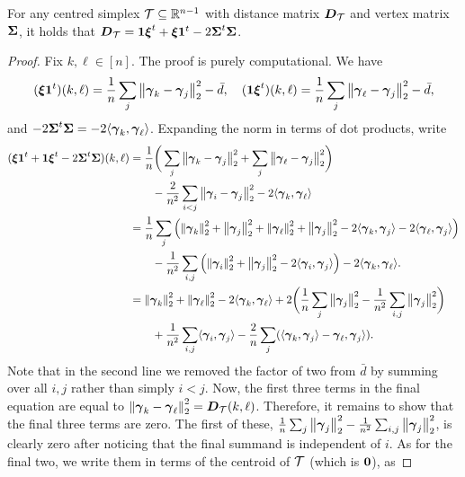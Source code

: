 \begin{lemma}
	\label{lem:distance_matrix}
	For any centred simplex $\mathcal{T}\subseteq\mathbb{R}^{n-1}$  with distance matrix $\vb*{D}_{\mathcal{T}}$ and vertex  matrix $\boldsymbol{\Sigma}$, it holds  that $\vb*{D}_{\mathcal{T}} = \vb{1}\vb*{\xi}^t + \vb*{\xi}\vb{1}^t - 2\boldsymbol{\Sigma}^t\boldsymbol{\Sigma}$.
\end{lemma}
\begin{proof}
	Fix  $k,\ell\in[n]$. The proof is purely computational. We have 
	\begin{equation*}
	(\vb*{\xi}\vb{1}^t)(k,\ell) = \frac{1}{n}\sum_j\norm{\vb*{\gamma}_k-\vb*{\gamma}_j}_2^2 - \bar{d},\quad (\vb{1}\vb*{\xi}^t)(k,\ell) = \frac{1}{n}\sum_j\norm{\vb*{\gamma}_\ell-\vb*{\gamma}_j}_2^2 - \bar{d}, 
	\end{equation*}
	and  $-2\boldsymbol{\Sigma}^t\boldsymbol{\Sigma} = -2\langle \vb*{\gamma}_k,\vb*{\gamma}_\ell\rangle$. 
	Expanding the norm in terms of dot products, write
	\begin{align*}
	(\vb*{\xi}\vb{1}^t + \vb{1}\vb*{\xi}^t - 2\boldsymbol{\Sigma}^t\boldsymbol{\Sigma})(k,\ell) &= \frac{1}{n}\bigg(\sum_j \norm{\vb*{\gamma}_k-\vb*{\gamma}_j}_2^2 + \sum_j\norm{\vb*{\gamma}_\ell-\vb*{\gamma}_j}_2^2 \bigg) \\
	&\qquad- \frac{2}{n^2}\sum_{i<j} \norm{\vb*{\gamma}_i-\vb*{\gamma}_j}_2^2 -2\langle\vb*{\gamma}_k,\vb*{\gamma}_\ell\rangle \\ 
	&=\frac{1}{n}\sum_j\left(\norm{\vb*{\gamma}_k}_2^2 + \norm{\vb*{\gamma}_j}_2^2+\norm{\vb*{\gamma}_\ell}_2^2 +\norm{\vb*{\gamma}_j}_2^2  -2\langle \vb*{\gamma}_k,\vb*{\gamma}_j\rangle -2\langle\vb*{\gamma}_\ell,\vb*{\gamma}_j\rangle\right) \\
	&\qquad -\frac{1}{n^2}\sum_{i,j}\left(\norm{\vb*{\gamma}_i}_2^2+\norm{\vb*{\gamma}_j}_2^2-2\langle\vb*{\gamma}_i,\vb*{\gamma}_j\rangle\right)  -2\langle \vb*{\gamma}_k,\vb*{\gamma}_\ell\rangle. \\
	&= \norm{\vb*{\gamma}_k}_2^2 + \norm{\vb*{\gamma}_\ell}_2^2 - 2\langle\vb*{\gamma}_k,\vb*{\gamma}_\ell\rangle + 2\bigg(\frac{1}{n}\sum_j\norm{\vb*{\gamma}_j}_2^2 - \frac{1}{n^2}\sum_{i,j}\norm{\vb*{\gamma}_j}_2^2\bigg)  \\
	&\qquad +\frac{1}{n^2}\sum_{i,j} \langle \vb*{\gamma}_i,\vb*{\gamma}_j\rangle - \frac{2}{n}\sum_j (\langle \vb*{\gamma}_k,\vb*{\gamma}_j\rangle -\vb*{\gamma}_\ell,\vb*{\gamma}_j\rangle).
	\end{align*} 
	Note that in the second  line we removed the factor of two from $\bar{d}$ by summing over all $i,j$ rather than simply $i<j$. 
	Now, the first three terms in the final equation are  equal to $\norm{\vb*{\gamma}_k-\vb*{\gamma}_\ell}_2^2=\vb*{D}_{\mathcal{T}}(k,\ell)$. Therefore,  it remains  to show  that the final  three terms are zero. The first  of  these, $\frac{1}{n}\sum_j\norm{\vb*{\gamma}_j}_2^2 - \frac{1}{n^2}\sum_{i,j}\norm{\vb*{\gamma}_j}_2^2$,  is clearly   zero after noticing that the final summand is independent of $i$. As for the final two, we write them in terms of  the centroid of $\mathcal{T}$ (which is $\vb{0}$), as 

\end{proof}
